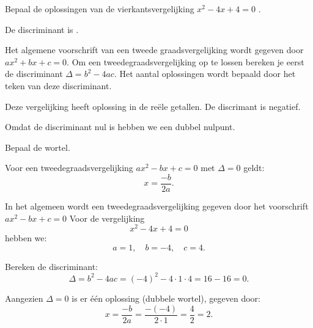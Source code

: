 \documentclass{ximera}
\begin{document}
\begin{exercise}

    Bepaal de oplossingen van de vierkantsvergelijking \( x^2 - 4x + 4 = 0 \) .

    
    \begin{question}
    De discriminant is \choicenul. 
    \begin{feedback}
        Het algemene voorschrift van een tweede graadsvergelijking wordt gegeven door  \(ax^2 + bx + c = 0\). 
        Om een tweedegraadsvergelijking op te lossen bereken je eerst de discriminant \(\Delta = b^2 - 4ac\). 
        Het aantal oplossingen wordt bepaald door het teken van deze discriminant. 
    \end{feedback}
    \end{question}
    
    \begin{question}
    Deze vergelijking heeft \choiceeen oplossing in de reële getallen. De discrimant is negatief. 
    \begin{feedback}
        Omdat de discriminant nul is hebben we een dubbel nulpunt. 
    \end{feedback}
    \end{question}
    
    \begin{question}
    Bepaal de wortel.
    \begin{hint}
        Voor een tweedegraadsvergelijking \(ax^2 - bx + c = 0\) met \(\Delta = 0\) geldt:
        \[
        x = \frac{-b}{2a}.
        \]
    \end{hint}
    \end{question}
    
    \begin{oplossing}
    In het algemeen wordt een tweedegraadsvergelijking gegeven door het voorschrift \( ax^2 - bx + c = 0 \) 
    Voor de vergelijking 
    \[
    x^2 - 4x + 4 = 0
    \]
    hebben we:
    \[
    a = 1,\quad b = -4,\quad c = 4.
    \]
    
    \vspace{3mm}
    
    Bereken de discriminant:
    \[
    \Delta = b^2 - 4ac = (-4)^2 - 4\cdot1\cdot4 = 16 - 16 = 0.
    \]
    
    Aangezien \(\Delta = 0\) is er één oplossing (dubbele wortel), gegeven door:
    \[
    x = \frac{-b}{2a} = \frac{-(-4)}{2\cdot1} = \frac{4}{2} = 2.
    \]
    
    \vspace{3mm}
    

\end{oplossing}
\end{exercise}
\end{document}
